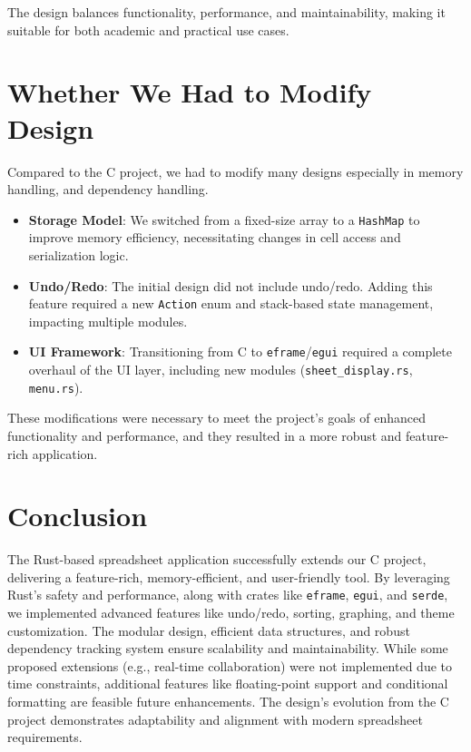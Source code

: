 \documentclass{article}
\begin{document}
The design balances functionality, performance, and maintainability, making it suitable for both academic and practical use cases.

\section{Whether We Had to Modify Design}
Compared to the C project, we had to modify many designs especially in memory handling, and dependency handling. 

\begin{itemize}
    \item \textbf{Storage Model}: We switched from a fixed-size array to a \texttt{HashMap} to improve memory efficiency, necessitating changes in cell access and serialization logic.
    \item \textbf{Undo/Redo}: The initial design did not include undo/redo. Adding this feature required a new \texttt{Action} enum and stack-based state management, impacting multiple modules.
    \item \textbf{UI Framework}: Transitioning from C to \texttt{eframe}/\texttt{egui} required a complete overhaul of the UI layer, including new modules (\texttt{sheet\_display.rs}, \texttt{menu.rs}).
\end{itemize}

These modifications were necessary to meet the project’s goals of enhanced functionality and performance, and they resulted in a more robust and feature-rich application.

\section{Conclusion}
The Rust-based spreadsheet application successfully extends our C project, delivering a feature-rich, memory-efficient, and user-friendly tool. By leveraging Rust’s safety and performance, along with crates like \texttt{eframe}, \texttt{egui}, and \texttt{serde}, we implemented advanced features like undo/redo, sorting, graphing, and theme customization. The modular design, efficient data structures, and robust dependency tracking system ensure scalability and maintainability. While some proposed extensions (e.g., real-time collaboration) were not implemented due to time constraints, additional features like floating-point support and conditional formatting are feasible future enhancements. The design’s evolution from the C project demonstrates adaptability and alignment with modern spreadsheet requirements.
\end{document}

